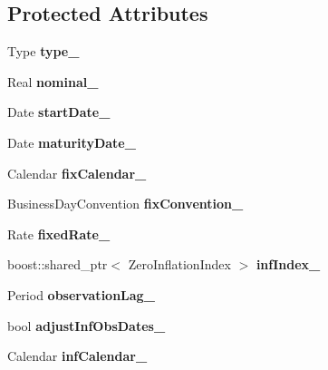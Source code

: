 \subsection*{Protected Attributes}
\begin{DoxyCompactItemize}
\item 
Type {\bfseries type\+\_\+}\label{class_quant_lib_1_1_zero_coupon_inflation_swap_a3e5371ce4d9959f7980ca182caac69c2}

\item 
Real {\bfseries nominal\+\_\+}\label{class_quant_lib_1_1_zero_coupon_inflation_swap_ac01fcd1429b5df7b590c46dfea23a3ed}

\item 
Date {\bfseries start\+Date\+\_\+}\label{class_quant_lib_1_1_zero_coupon_inflation_swap_a7079158926589371fdef8567516a7465}

\item 
Date {\bfseries maturity\+Date\+\_\+}\label{class_quant_lib_1_1_zero_coupon_inflation_swap_a94ce4aa5f3a84bfe7617e811e90508f6}

\item 
Calendar {\bfseries fix\+Calendar\+\_\+}\label{class_quant_lib_1_1_zero_coupon_inflation_swap_ab2b3cd9f973572835cd57cb75258a4f1}

\item 
Business\+Day\+Convention {\bfseries fix\+Convention\+\_\+}\label{class_quant_lib_1_1_zero_coupon_inflation_swap_acd58eb28c4da2e0add07c0a55bbbae98}

\item 
Rate {\bfseries fixed\+Rate\+\_\+}\label{class_quant_lib_1_1_zero_coupon_inflation_swap_a155df9616ef2306510655c53235d7f43}

\item 
boost\+::shared\+\_\+ptr$<$ Zero\+Inflation\+Index $>$ {\bfseries inf\+Index\+\_\+}\label{class_quant_lib_1_1_zero_coupon_inflation_swap_a294e9c3101a727cb0b5f7b7dc593446a}

\item 
Period {\bfseries observation\+Lag\+\_\+}\label{class_quant_lib_1_1_zero_coupon_inflation_swap_ad5fbe98deee4edc850722ffe3d485d88}

\item 
bool {\bfseries adjust\+Inf\+Obs\+Dates\+\_\+}\label{class_quant_lib_1_1_zero_coupon_inflation_swap_a733cc22e571ce8486d94be8048861a2e}

\item 
Calendar {\bfseries inf\+Calendar\+\_\+}\label{class_quant_lib_1_1_zero_coupon_inflation_swap_a022be4d6da2622b3911472cf50113142}


\end{DoxyCompactItemize}
